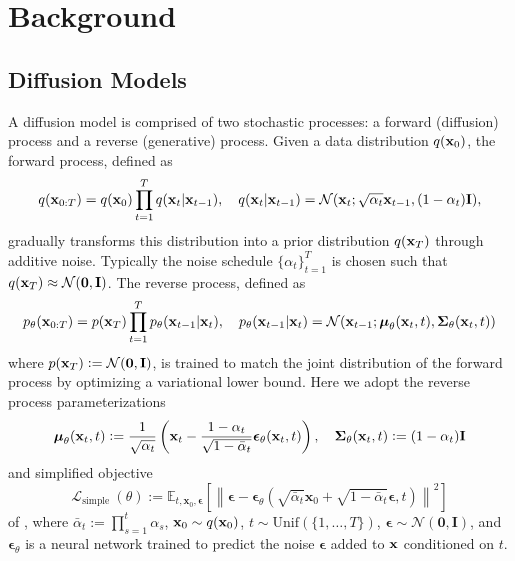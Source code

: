 \section{Background}
\subsection{Diffusion Models}
A diffusion model \citep{ddpm, sohldickstein} is comprised of two stochastic processes:  a forward (diffusion) process and a reverse (generative) process. Given a data distribution $q(\mathbf{x}_0)$, the forward process, defined as
\begin{equation}
q (\mathbf{x}_{0: T})=q(\mathbf{x}_0) \prod_{t=1}^T q (\mathbf{x}_t | \mathbf{x}_{t-1} ), \quad q (\mathbf{x}_t | \mathbf{x}_{t-1} )=\mathcal{N} (\mathbf{x}_t ; \sqrt{\alpha_t} \mathbf{x}_{t-1}, (1-\alpha_t) \mathbf{I} ),
\end{equation}
gradually transforms this distribution into a prior distribution $q(\mathbf{x}_T)$ through additive noise. Typically the noise schedule $\{\alpha_t\}_{t=1}^T$ is chosen such that $q(\mathbf{x}_T) \approx \mathcal{N}(\mathbf{0},\mathbf{I})$. The reverse process, defined as 
\begin{equation}
p_\theta (\mathbf{x}_{0: T} )=p (\mathbf{x}_T ) \prod_{t=1}^T p_\theta (\mathbf{x}_{t-1} | \mathbf{x}_t ), \quad p_\theta (\mathbf{x}_{t-1} | \mathbf{x}_t )=\mathcal{N} (\mathbf{x}_{t-1} ; \boldsymbol{\mu}_\theta (\mathbf{x}_t, t ), \boldsymbol{\Sigma}_\theta (\mathbf{x}_t, t ) )
\end{equation}
where $p(\mathbf{x}_T) \vcentcolon= \mathcal{N}(\mathbf{0},\mathbf{I})$, is trained to match the joint distribution of the forward process by optimizing a variational lower bound. Here we adopt the reverse process parameterizations
\begin{equation}
    \boldsymbol{\mu}_\theta (\mathbf{x}_t, t ) \vcentcolon= \frac{1}{\sqrt{\alpha_t}}\left(\mathbf{x}_t-\frac{1-\alpha_t}{\sqrt{1-\bar{\alpha}_t}} \boldsymbol{\epsilon}_\theta (\mathbf{x}_t, t)\right), \quad \boldsymbol{\Sigma}_\theta (\mathbf{x}_t, t ) \vcentcolon= (1-\alpha_t)\mathbf{I}
\end{equation}
and simplified objective
\begin{equation}
    \mathcal{L}_{\text {simple }}(\theta):=\mathbb{E}_{t, \mathbf{x}_0, \boldsymbol{\epsilon}}\left[\left\|\boldsymbol{\epsilon}-\boldsymbol{\epsilon}_\theta\left(\sqrt{\bar{\alpha}_t} \mathbf{x}_0+\sqrt{1-\bar{\alpha}_t} \boldsymbol{\epsilon}, t\right)\right\|^2\right]
    \label{eq:lsimple-ddpm}
\end{equation}
 of \citet{ddpm}, where $\bar{\alpha}_t:=\prod_{s=1}^t \alpha_s$, $\mathbf{x}_0 \sim q(\mathbf{x}_0)$, $t \sim \text{Unif}(\{1, \ldots, T\})$,  $\boldsymbol{\epsilon} \sim \mathcal{N}(\mathbf{0},\mathbf{I})$, and $\boldsymbol{\epsilon}_\theta$ is a neural network trained to predict the noise $\boldsymbol{\epsilon}$ added to $\mathbf{x}$ conditioned on $t$.
